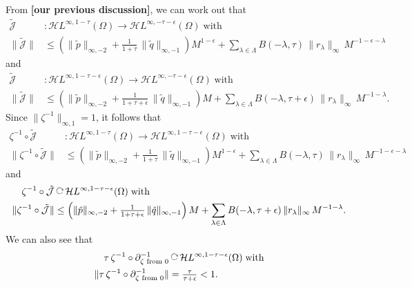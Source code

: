 \documentclass{article}
\theoremstyle{plain}
\newcommand{\maps}{\colon}
\newcommand{\acts}{\mathbin{\raisebox{\depth}{\rotatebox{-90}{$\circlearrowright$}}}}
\begin{document}
From \textbf{[our previous discussion]}, we can work out that
\begin{align*}
\tilde{\mathcal{J}} & \maps \mathcal{H}L^{\infty, 1-\tau}(\Omega) \to \mathcal{H}L^{\infty, -\tau-\epsilon}(\Omega)\;\text{with} \\
\|\tilde{\mathcal{J}}\| & \le \left(\|\tilde{p}\|_{\infty, -2} + \tfrac{1}{1+\tau}\,\|\tilde{q}\|_{\infty, -1} \right) M^{1-\epsilon} + \sum_{\lambda \in \Lambda} B(-\lambda, \tau)\,\|r_\lambda\|_{\infty}\,M^{-1-\epsilon-\lambda}
\end{align*}
and
\begin{align*}
\tilde{\mathcal{J}} & \maps \mathcal{H}L^{\infty, 1-\tau-\epsilon}(\Omega) \to \mathcal{H}L^{\infty, -\tau-\epsilon}(\Omega)\;\text{with} \\
\|\tilde{\mathcal{J}}\| & \le \left(\|\tilde{p}\|_{\infty, -2} + \tfrac{1}{1+\tau+\epsilon}\,\|\tilde{q}\|_{\infty, -1} \right) M + \sum_{\lambda \in \Lambda} B(-\lambda, \tau+\epsilon)\,\|r_\lambda\|_{\infty}\,M^{-1-\lambda}.
\end{align*}
Since $\|\zeta^{-1}\|_{\infty, 1} = 1$, it follows that
\begin{align}
\zeta^{-1} \circ \tilde{\mathcal{J}} & \maps \mathcal{H}L^{\infty, 1-\tau}(\Omega) \to \mathcal{H}L^{\infty, 1-\tau-\epsilon}(\Omega)\;\text{with} \nonumber \\
\|\zeta^{-1} \circ \tilde{\mathcal{J}}\| & \le \left(\|\tilde{p}\|_{\infty, -2} + \tfrac{1}{1+\tau}\,\|\tilde{q}\|_{\infty, -1} \right) M^{1-\epsilon} + \sum_{\lambda \in \Lambda} B(-\lambda, \tau)\,\|r_\lambda\|_{\infty}\,M^{-1-\epsilon-\lambda} \label{bound:mollify}
\end{align}
and
\begin{align}
\zeta^{-1} \circ \tilde{\mathcal{J}} & \acts \mathcal{H}L^{\infty, 1-\tau-\epsilon}(\Omega)\;\text{with} \nonumber \\
\|\zeta^{-1} \circ \tilde{\mathcal{J}}\| & \le \left(\|\tilde{p}\|_{\infty, -2} + \tfrac{1}{1+\tau+\epsilon}\,\|\tilde{q}\|_{\infty, -1} \right) M + \sum_{\lambda \in \Lambda} B(-\lambda, \tau+\epsilon)\,\|r_\lambda\|_{\infty}\,M^{-1-\lambda}. \label{bound:perturb}
\end{align}
We can also see that
\begin{align}
\tau\,\zeta^{-1} \circ \partial^{-1}_{\zeta \text{ from } 0} & \acts \mathcal{H}L^{\infty, 1-\tau-\epsilon}(\Omega)\;\text{with} \nonumber \\
\|\tau\,\zeta^{-1} \circ \partial^{-1}_{\zeta \text{ from } 0}\| & = \tfrac{\tau}{\tau+\epsilon} < 1 \label{bound:contract}.
\end{align}
\end{document}
